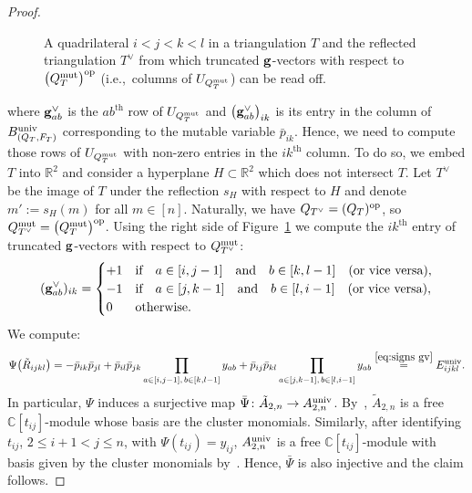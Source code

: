 \documentclass[pdftex]{sigma}%
\numberwithin{equation}{section}
\begin{document}
\begin{proof}
\begin{figure}
 \caption{A quadrilateral $i<j<k<l$ in a triangulation $T$ and the reflected triangulation $T^\vee$ from which truncated ${\bf g}$-vectors with respect to $\big(Q_T^{\rm mut}\big)^{\rm op}$ (i.e.,~columns of $U_{Q_T^{\rm mut}}$) can be read off.}
 \label{fig:ex rel Auniv}
\end{figure}\noindent
where ${\bf g}^\vee_{ab}$ is the $ab^{\text{th}}$ row of $U_{Q_T^{\rm mut}}$ and $\big({\bf g}^\vee_{ab}\big)_{ik}$ is its entry in the column of $B_{(Q_T,F_T)}^{\rm univ}$ corresponding to the mutable variable $\bar p_{ik}$.
Hence, we need to compute those rows of $U_{Q_T^{\rm mut}}$ with non-zero entries in the $ik^{\text{th}}$ column.
To do so, we embed $T$ into $\mathbb R^2$ and consider a hyperplane $H\subset \mathbb R^2$ which does not intersect $T$.
Let $T^\vee$ be the image of $T$ under the reflection $s_H$ with respect to $H$ and denote $m':=s_H(m)$ for all $m\in [n]$.
Naturally, we have $Q_{T^\vee}=(Q_T)^{\rm op}$, so $Q^{\rm mut}_{T^\vee}=\big(Q_T^{\rm mut}\big)^{\rm op}$.
Using the right side of Figure~\ref{fig:ex rel Auniv} we compute the $ik^{\text{th}}$ entry of truncated ${\bf g}$-vectors with respect to $Q^{\rm mut}_{T^{\vee}}$:\vspace{-1ex}
\begin{equation}\label{eq:signs gv}
({\bf g}^\vee_{ab})_{ik} =
\begin{cases}
 +1 & \text{if}\quad a\in[i,j-1]\quad \text{and}\quad b\in [k,l-1]\quad \text{(or vice versa)},\\
 -1 & \text{if}\quad a\in[j,k-1]\quad \text{and}\quad b\in [l,i-1]\quad \text{(or vice versa)},\\
 0 & \text{otherwise}.
\end{cases}
\end{equation}
We compute:\vspace{-1ex}
\begin{displaymath}
\Psi\big(\tilde R_{ijkl}\big)
= - \bar p_{ik}\bar p_{jl} + \bar p_{il}\bar p_{jk} \prod_{a\in[i,j-1],\,b\in[k,l-1]} y_{ab} + \bar p_{ij}\bar p_{kl} \prod_{a\in[j,k-1],\,b\in[l,i-1]} y_{ab} \overset{\eqref{eq:signs gv}}{=} E_{ijkl}^{\rm univ}.
\end{displaymath}
In particular, $\Psi$ induces a surjective map $\bar \Psi\colon \tilde A_{2,n} \to A_{2,n}^{\rm univ}$.
By~, $\tilde A_{2,n}$ is a free $\mathbb C[t_{ij}]$-module whose basis are the cluster monomials.
Similarly, after identifying $t_{ij}$, $2\le i+1<j\le n$, with $\Psi(t_{ij})=y_{ij}$, $A_{2,n}^{\rm univ}$ is a free $\mathbb C[t_{ij}]$-module with basis given by the cluster monomials by~\cite[Theorem~0.3 and p.~502]{GHKK}.
Hence, $\bar \Psi$ is also injective and the claim follows.
\end{proof}
\end{document}

